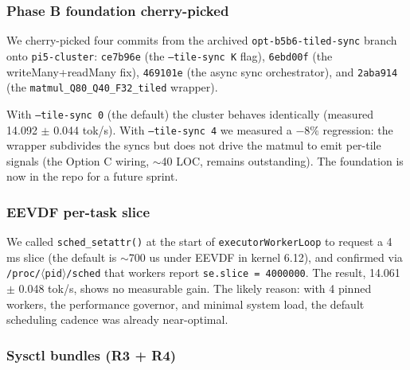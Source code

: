 \documentclass[10pt,a4paper]{article}
\begin{document}
\subsubsection{Phase B foundation cherry-picked}

We cherry-picked four commits from the archived \texttt{opt-b5b6-tiled-sync} branch onto \texttt{pi5-cluster}: \texttt{ce7b96e} (the \texttt{--tile-sync K} flag), \texttt{6ebd00f} (the writeMany+readMany fix), \texttt{469101e} (the async sync orchestrator), and \texttt{2aba914} (the \texttt{matmul\_Q80\_Q40\_F32\_tiled} wrapper).

With \texttt{--tile-sync 0} (the default) the cluster behaves identically (measured 14.092 $\pm$ 0.044 tok/s). With \texttt{--tile-sync 4} we measured a $-8\%$ regression: the wrapper subdivides the syncs but does not drive the matmul to emit per-tile signals (the Option C wiring, $\sim$40 LOC, remains outstanding). The foundation is now in the repo for a future sprint.

\subsubsection{EEVDF per-task slice}

We called \texttt{sched\_setattr()} at the start of \texttt{executorWorkerLoop} to request a 4 ms slice (the default is $\sim$700 us under EEVDF in kernel 6.12), and confirmed via \texttt{/proc/$\langle$pid$\rangle$/sched} that workers report \texttt{se.slice = 4000000}. The result, 14.061 $\pm$ 0.048 tok/s, shows no measurable gain. The likely reason: with 4 pinned workers, the performance governor, and minimal system load, the default scheduling cadence was already near-optimal.

\subsubsection{Sysctl bundles (R3 + R4)}
\end{document}
